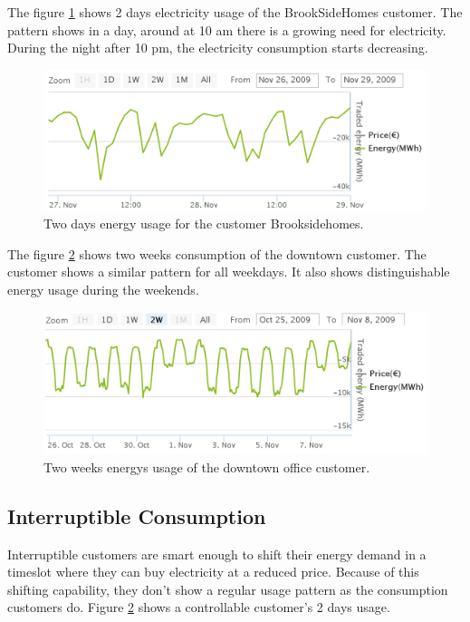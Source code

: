 The figure  \ref{fig:2daysbrook} shows 2 days electricity usage of the BrookSideHomes customer. The pattern shows in a day, around at 10 am there is a growing need for electricity. During the night after 10 pm, the electricity consumption starts decreasing.
\begin{figure}[h!]
  \includegraphics[width=\linewidth]{BrooksideHomes-2days.png}
  \caption{Two days energy usage for the customer Brooksidehomes.}
  \label{fig:2daysbrook}
\end{figure}

The figure \ref{fig:2weekOffice} shows two weeks consumption of the downtown customer. The customer shows a similar pattern for all weekdays. It also shows  distinguishable energy usage during the weekends.

\begin{figure}[h!]
  \includegraphics[width=\linewidth]{downtown-offc-2-weeks.png}
  \caption{Two weeks energys usage of the downtown office customer.}
  \label{fig:2weekOffice}
\end{figure}

\subsection{Interruptible Consumption}
Interruptible customers are smart enough to shift their energy demand in a timeslot where they can buy electricity at a reduced price. Because of this shifting capability, they don't show a regular usage pattern as the consumption customers do. Figure \ref{fig:2weekOffice} shows a controllable customer's 2 days usage.

